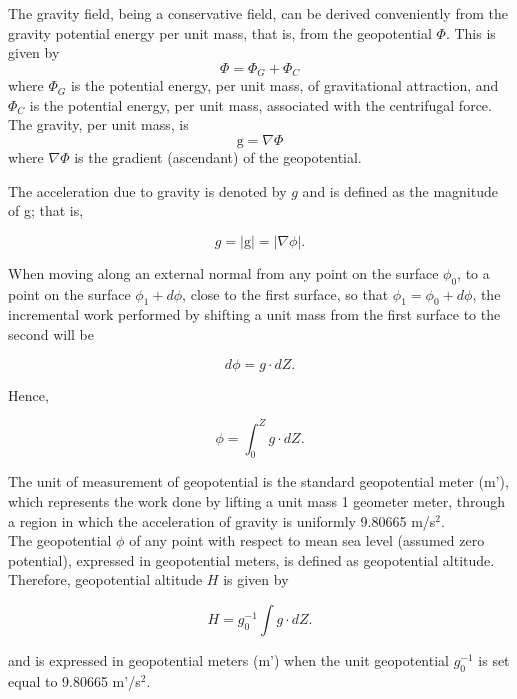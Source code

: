 \documentclass{article}
\begin{document}
The gravity field, being a conservative field, can be derived conveniently from the gravity potential energy per unit mass, that is, from the geopotential $\Phi$. This is given by
\[
\Phi = \Phi_G + \Phi_C \tag{10}
\]
where $\Phi_G$ is the potential energy, per unit mass, of gravitational attraction, and $\Phi_C$ is the potential energy, per unit mass, associated with the centrifugal force. The gravity, per unit mass, is
\[
 \text{g} = \nabla \Phi \tag{11}
\]
where $\nabla \Phi$ is the gradient (ascendant) of the geopotential.

The acceleration due to gravity is denoted by $g$ and is defined as the magnitude of g; that is,

\begin{equation}
 g = |\text{g}| = |\nabla \phi|. \tag{12}
\end{equation}

When moving along an external normal from any point on the surface $\phi_0$, to a point on the surface $\phi_1+d\phi$, close to the first surface, so that $\phi_1 = \phi_0 + d\phi$, the incremental work performed by shifting a unit mass from the first surface to the second will be

\begin{equation}
 d\phi = g \cdot dZ. \tag{13}
\end{equation}

Hence,

\begin{equation}
 \phi = \int_{0}^{Z} g \cdot dZ . \tag{14}
\end{equation}

The unit of measurement of geopotential is the standard geopotential meter (m'), which represents the work done by lifting a unit mass 1 geometer meter, through a region in which the acceleration of gravity is uniformly 9.80665 m/s$^2$. \\

The geopotential $\phi$ of any point with respect to mean sea level (assumed zero potential), expressed in geopotential meters, is defined as geopotential altitude. \\
Therefore, geopotential altitude $H$ is given by

\begin{equation}
 H = g_0^{-1} \int g \cdot dZ. \tag{15}
\end{equation}

and is expressed in geopotential meters (m') when the unit geopotential $g_0^{-1}$ is set equal to 9.80665 m'/s$^2$. \\
\end{document}

